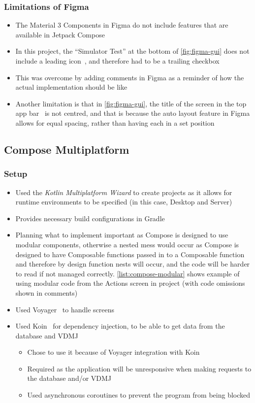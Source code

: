 \documentclass[../dissertation.tex]{subfiles}
\begin{document}
\subsubsection{Limitations of Figma}
\begin{itemize}
  \item The Material 3 Components in Figma do not include features that are available in
    Jetpack Compose
  \item In this project, the \enquote{Simulator Test} at the bottom of \autoref{fig:figma-gui}
    does not include a leading icon~\cite{material:lists}, and therefore had to be a trailing
    checkbox
  \item This was overcome by adding comments in Figma as a reminder of how the actual implementation
    should be like
  \item Another limitation is that in \autoref{fig:figma-gui}, the title of the screen in the
    top app bar~\cite{material:top-app-bar} is not centred, and that is because the auto layout
    feature in Figma allows for equal spacing, rather than having each in a set position
\end{itemize}


\subsection{Compose Multiplatform}
\subsubsection{Setup}
\begin{itemize}
  \item Used the \textit{Kotlin Multiplatform Wizard} to create projects as it allows
    for runtime environments to be specified (in this case, Desktop and Server)
  \item Provides necessary build configurations in Gradle
  \item Planning what to implement important as Compose is designed to use modular
    components, otherwise a nested mess would occur as Compose is designed to have
    Composable functions passed in to a Composable function and therefore by design
    function nests will occur, and the code will be harder to read if not managed correctly.
    \autoref{list:compose-modular} shows example of using modular code
    from the Actions screen in project (with code omissions shown in comments)
  \item Used Voyager~\cite{voyager} to handle screens
  \item Used Koin~\cite{koin} for dependency injection, to be able to get data from the
    database and VDMJ
    \begin{itemize}
      \item Chose to use it because of Voyager integration with Koin~\cite{voyager:koin}
      \item Required as the application will be unresponsive when making requests
        to the database and/or VDMJ
      \item Used asynchronous coroutines to prevent the program from being blocked
    \end{itemize}
\end{itemize}
\end{document}

